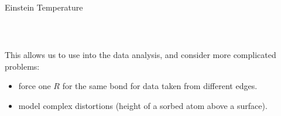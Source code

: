 \begin{frame}[fragile]
\begin{columns}
\begin{column}{57mm}
\begin{CodeBlock}{55mm}{Einstein Temperature }
  \end{CodeBlock}\\
\end{column}
\end{columns}

\vmm This allows us to use {} into the data analysis, and
consider more complicated problems:

\vfill

  \begin{itemize}
  \item force one $R$ for the same bond for data taken from different
    edges.

  \item model complex distortions (height of a sorbed atom above a surface).
  \end{itemize}


\end{frame}










